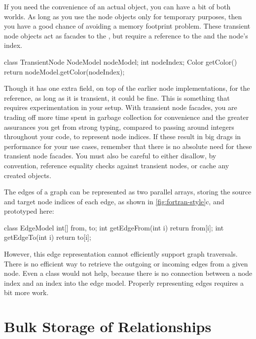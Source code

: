If you need the convenience of an actual  object, you can have a
bit of both worlds. As long as you use the node objects
only for temporary purposes, then you have a good chance of avoiding a memory
footprint problem. These transient node objects act as facades to the
, but require a reference to the  and the
node's index. 
\begin{shortlisting}
class TransientNode {
   NodeModel nodeModel;
   int nodeIndex;
   Color getColor() {
      return nodeModel.getColor(nodeIndex);
   }
}
\end{shortlisting}
Though it has one extra field, on top of the earlier node implementations, for
the  reference, as long as it is transient, it could be fine.
This is something that requires experimentation in your setup. With transient
node facades, you are trading off more time spent in garbage collection for
convenience and the greater assurances you get from strong typing, compared to
passing around integers throughout your code, to represent node indices.
If these result in big drags in performance for your use cases, remember
that there is no absolute need for these transient node facades. You must also
be careful to either disallow, by convention, reference equality checks against
transient nodes, or cache any created objects.

The edges of a graph can be represented as two parallel arrays, storing the
source and target node indices of each edge, as shown in
\autoref{fig:fortran-style}c, and prototyped here:
\begin{shortlisting}
class EdgeModel {
   int[] from, to;
   int getEdgeFrom(int i) {
      return from[i];
   }
   int getEdgeTo(int i) {
      return to[i];
   }
}
\end{shortlisting}
However, this edge representation cannot efficiently support graph
traversals. There is no efficient way to retrieve the outgoing or
incoming edges from a given node. Even a  class would not
help, because there is no connection between a node index and an index
into the edge model. Properly representing edges requires a bit more work. 

\section{Bulk Storage of Relationships}

